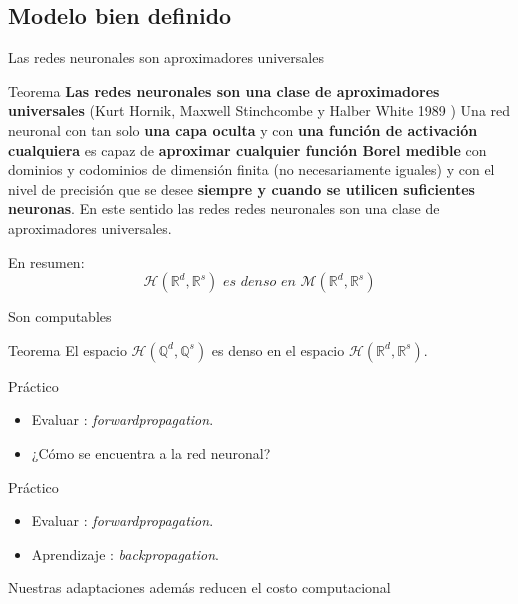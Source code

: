\documentclass{beamer}
\newcommand{\R}{\mathbb{R}}
\newcommand{\Q}{\mathbb{Q}}
\newcommand{\rrnnmc}{ \mathcal{H}(\R^d,\R^s)}
\begin{document}
\subsection{Modelo bien definido}
\begin{frame}{Las redes neuronales son aproximadores universales}
    \begin{block}{Teorema  \textbf{Las redes neuronales son una clase de aproximadores universales}}
        (Kurt Hornik, Maxwell Stinchcombe y Halber White 1989 \cite{HORNIK1989359})
        Una red neuronal con tan solo \textbf{una capa oculta} y con \textbf{una función de activación cualquiera} es capaz de \textbf{aproximar cualquier 
        función Borel medible}  con dominios y codominios de dimensión finita (no necesariamente iguales) y con el nivel de precisión que se desee \textbf{siempre y cuando 
        se utilicen suficientes neuronas}. En este sentido las redes redes neuronales son una clase de aproximadores universales.
    \end{block}
    En resumen: 
    \begin{equation*}
        \mathcal{H}(\R^d,\R^s)  \textit{ es denso en } \mathcal{M}(\R^d,\R^s) 
    \end{equation*}
\end{frame}
\begin{frame}{Son computables}
    \begin{exampleblock}{Teorema}
        El espacio $\mathcal{H}(\Q^d, \Q^s)$ es denso en el espacio $\rrnnmc$. 
    \end{exampleblock}
\end{frame}



\begin{frame}{Práctico}
    \pause
    \begin{itemize}
        \item Evaluar \textcolor{teal}{\checkmark}: \textit{forwardpropagation}.
        \item ¿Cómo se encuentra a la red neuronal?
    \end{itemize}
\end{frame}
\begin{frame}{Práctico}
    \begin{itemize}
        \item Evaluar \textcolor{teal}{\checkmark}: \textit{forwardpropagation}.
        \item Aprendizaje \textcolor{teal}{\checkmark}:  \textit{backpropagation}.
    \end{itemize}
    \pause 
    Nuestras adaptaciones además reducen el costo computacional
\end{frame}
\end{document}
